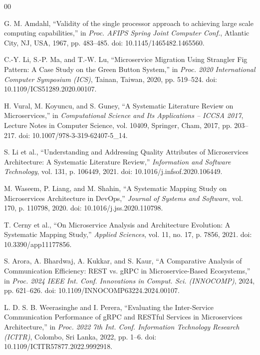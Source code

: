 \documentclass[conference]{IEEEtran}
\begin{document}
\begin{thebibliography}{00}

 G. M. Amdahl, ``Validity of the single processor approach to achieving large scale computing capabilities,'' in \textit{Proc. AFIPS Spring Joint Computer Conf.}, Atlantic City, NJ, USA, 1967, pp. 483--485. doi: 10.1145/1465482.1465560.

 C.-Y. Li, S.-P. Ma, and T.-W. Lu, ``Microservice Migration Using Strangler Fig Pattern: A Case Study on the Green Button System,'' in \textit{Proc. 2020 International Computer Symposium (ICS)}, Tainan, Taiwan, 2020, pp. 519--524. doi: 10.1109/ICS51289.2020.00107.

 H. Vural, M. Koyuncu, and S. Guney, ``A Systematic Literature Review on Microservices,'' in \textit{Computational Science and Its Applications -- ICCSA 2017}, Lecture Notes in Computer Science, vol. 10409, Springer, Cham, 2017, pp. 203--217. doi: 10.1007/978-3-319-62407-5\_14.

 S. Li et al., ``Understanding and Addressing Quality Attributes of Microservices Architecture: A Systematic Literature Review,'' \textit{Information and Software Technology}, vol. 131, p. 106449, 2021. doi: 10.1016/j.infsof.2020.106449.

 M. Waseem, P. Liang, and M. Shahin, ``A Systematic Mapping Study on Microservices Architecture in DevOps,'' \textit{Journal of Systems and Software}, vol. 170, p. 110798, 2020. doi: 10.1016/j.jss.2020.110798.

 T. Cerny et al., ``On Microservice Analysis and Architecture Evolution: A Systematic Mapping Study,'' \textit{Applied Sciences}, vol. 11, no. 17, p. 7856, 2021. doi: 10.3390/app11177856.

 S. Arora, A. Bhardwaj, A. Kukkar, and S. Kaur, ``A Comparative Analysis of Communication Efficiency: REST vs. gRPC in Microservice-Based Ecosystems,'' in \textit{Proc. 2024 IEEE Int. Conf. Innovations in Comput. Sci. (INNOCOMP)}, 2024, pp. 621--626. doi: 10.1109/INNOCOMP63224.2024.00107.

 L. D. S. B. Weerasinghe and I. Perera, ``Evaluating the Inter-Service Communication Performance of gRPC and RESTful Services in Microservices Architecture,'' in \textit{Proc. 2022 7th Int. Conf. Information Technology Research (ICITR)}, Colombo, Sri Lanka, 2022, pp. 1--6. doi: 10.1109/ICITR57877.2022.9992918.


\end{thebibliography}
\end{document}
